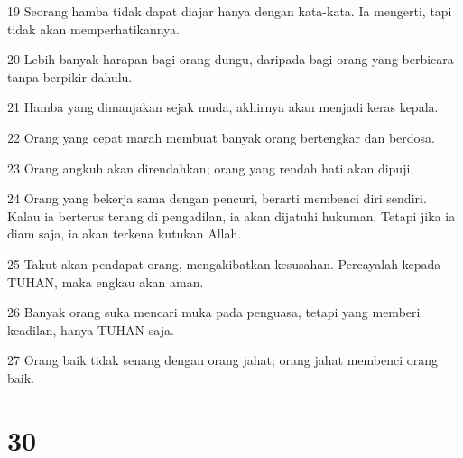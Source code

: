 \par 19 Seorang hamba tidak dapat diajar hanya dengan kata-kata. Ia mengerti, tapi tidak akan memperhatikannya.
\par 20 Lebih banyak harapan bagi orang dungu, daripada bagi orang yang berbicara tanpa berpikir dahulu.
\par 21 Hamba yang dimanjakan sejak muda, akhirnya akan menjadi keras kepala.
\par 22 Orang yang cepat marah membuat banyak orang bertengkar dan berdosa.
\par 23 Orang angkuh akan direndahkan; orang yang rendah hati akan dipuji.
\par 24 Orang yang bekerja sama dengan pencuri, berarti membenci diri sendiri. Kalau ia berterus terang di pengadilan, ia akan dijatuhi hukuman. Tetapi jika ia diam saja, ia akan terkena kutukan Allah.
\par 25 Takut akan pendapat orang, mengakibatkan kesusahan. Percayalah kepada TUHAN, maka engkau akan aman.
\par 26 Banyak orang suka mencari muka pada penguasa, tetapi yang memberi keadilan, hanya TUHAN saja.
\par 27 Orang baik tidak senang dengan orang jahat; orang jahat membenci orang baik.

\chapter{30}

